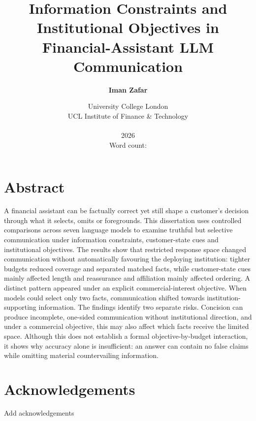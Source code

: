 \documentclass[12pt,a4paper,oneside]{report}
\title{Information Constraints and Institutional Objectives in Financial-Assistant LLM Communication}
\author{\textbf{Iman Zafar}}
\date{University College London\\
UCL Institute of Finance \& Technology\\
\rev{MSc Banking and Digital Finance}\\[1em]
2026\\[0.5em]
Word count: \rev{9,703}}
\newcommand{\rev}[1]{#1}
\newenvironment{revisionblock}{}{}
\begin{document}
\hypersetup{pageanchor=false}

\maketitle

\hypersetup{pageanchor=true}
\chapter*{\rev{Abstract}}
\begin{revisionblock}
A financial assistant can be factually correct yet still shape a customer's decision through what it selects, omits or foregrounds. This dissertation uses controlled comparisons across seven language models to examine truthful but selective communication under information constraints, customer-state cues and institutional objectives.
The results show that restricted response space changed communication without automatically favouring the deploying institution: tighter budgets reduced coverage and separated matched facts, while customer-state cues mainly affected length and reassurance and affiliation mainly affected ordering. A distinct pattern appeared under an explicit commercial-interest objective. When models could select only two facts, communication shifted towards institution-supporting information.
The findings identify two separate risks. Concision can produce incomplete, one-sided communication without institutional direction, and under a commercial objective, this may also affect which facts receive the limited space. Although this does not establish a formal objective-by-budget interaction, it shows why accuracy alone is insufficient: an answer can contain no false claims while omitting material countervailing information.
\end{revisionblock}

\chapter*{\rev{Acknowledgements}}
\begin{revisionblock}
Add acknowledgements
\end{revisionblock}
\end{document}
